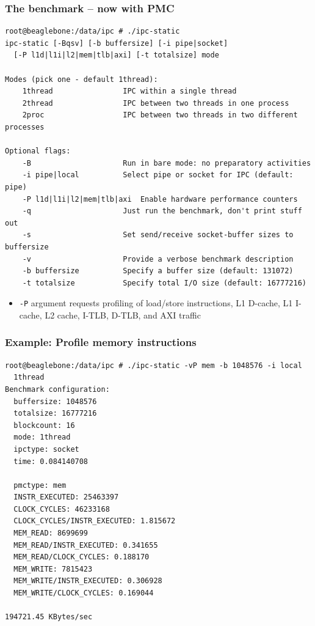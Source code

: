 \begin{frame}[fragile]
  \frametitle{The benchmark -- now with PMC}

  \begin{scriptsize}
\begin{verbatim}
root@beaglebone:/data/ipc # ./ipc-static 
ipc-static [-Bqsv] [-b buffersize] [-i pipe|socket]
  [-P l1d|l1i|l2|mem|tlb|axi] [-t totalsize] mode

Modes (pick one - default 1thread):
    1thread                IPC within a single thread
    2thread                IPC between two threads in one process
    2proc                  IPC between two threads in two different processes

Optional flags:
    -B                     Run in bare mode: no preparatory activities
    -i pipe|local          Select pipe or socket for IPC (default: pipe)
    -P l1d|l1i|l2|mem|tlb|axi  Enable hardware performance counters
    -q                     Just run the benchmark, don't print stuff out
    -s                     Set send/receive socket-buffer sizes to buffersize
    -v                     Provide a verbose benchmark description
    -b buffersize          Specify a buffer size (default: 131072)
    -t totalsize           Specify total I/O size (default: 16777216)
\end{verbatim}
  \end{scriptsize}

  \begin{itemize}
    \item \texttt{-P} argument requests profiling of load/store instructions,
      L1 D-cache, L1 I-cache, L2 cache, I-TLB, D-TLB, and AXI traffic
  \end{itemize}
\end{frame}

\begin{frame}[fragile]
  \frametitle{Example: Profile memory instructions}

  \begin{scriptsize}
\begin{verbatim}
root@beaglebone:/data/ipc # ./ipc-static -vP mem -b 1048576 -i local
  1thread
Benchmark configuration:
  buffersize: 1048576
  totalsize: 16777216
  blockcount: 16
  mode: 1thread
  ipctype: socket
  time: 0.084140708

  pmctype: mem
  INSTR_EXECUTED: 25463397
  CLOCK_CYCLES: 46233168
  CLOCK_CYCLES/INSTR_EXECUTED: 1.815672
  MEM_READ: 8699699
  MEM_READ/INSTR_EXECUTED: 0.341655
  MEM_READ/CLOCK_CYCLES: 0.188170
  MEM_WRITE: 7815423
  MEM_WRITE/INSTR_EXECUTED: 0.306928
  MEM_WRITE/CLOCK_CYCLES: 0.169044

194721.45 KBytes/sec
\end{verbatim}
  \end{scriptsize}
\end{frame}

